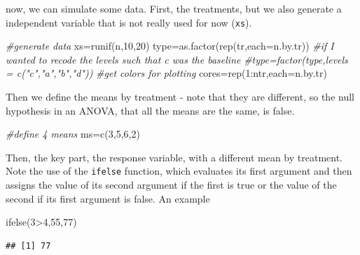 \documentclass[
]{book}
\newenvironment{Shaded}{\begin{snugshade}}{\end{snugshade}}
\newcommand{\AttributeTok}[1]{\textcolor[rgb]{0.77,0.63,0.00}{#1}}
\newcommand{\CommentTok}[1]{\textcolor[rgb]{0.56,0.35,0.01}{\textit{#1}}}
\newcommand{\DecValTok}[1]{\textcolor[rgb]{0.00,0.00,0.81}{#1}}
\newcommand{\FunctionTok}[1]{\textcolor[rgb]{0.00,0.00,0.00}{#1}}
\newcommand{\NormalTok}[1]{#1}
\newcommand{\OtherTok}[1]{\textcolor[rgb]{0.56,0.35,0.01}{#1}}
\newcommand{\SpecialCharTok}[1]{\textcolor[rgb]{0.00,0.00,0.00}{#1}}
\begin{document}
now, we can simulate some data. First, the treatments, but we also generate a independent variable that is not really used for now (\texttt{xs}).

\begin{Shaded}
\begin{Highlighting}[]
\CommentTok{\#generate data}
\NormalTok{xs}\OtherTok{=}\FunctionTok{runif}\NormalTok{(n,}\DecValTok{10}\NormalTok{,}\DecValTok{20}\NormalTok{)}
\NormalTok{type}\OtherTok{=}\FunctionTok{as.factor}\NormalTok{(}\FunctionTok{rep}\NormalTok{(tr,}\AttributeTok{each=}\NormalTok{n.by.tr))}
\CommentTok{\#if I wanted to recode the levels such that c was the baseline}
\CommentTok{\#type=factor(type,levels = c("c","a","b","d"))}
\CommentTok{\#get colors for plotting}
\NormalTok{cores}\OtherTok{=}\FunctionTok{rep}\NormalTok{(}\DecValTok{1}\SpecialCharTok{:}\NormalTok{ntr,}\AttributeTok{each=}\NormalTok{n.by.tr)}
\end{Highlighting}
\end{Shaded}

Then we define the means by treatment - note that they are different, so the null hypothesis in an ANOVA, that all the means are the same, is false.

\begin{Shaded}
\begin{Highlighting}[]
\CommentTok{\#define 4 means}
\NormalTok{ms}\OtherTok{=}\FunctionTok{c}\NormalTok{(}\DecValTok{3}\NormalTok{,}\DecValTok{5}\NormalTok{,}\DecValTok{6}\NormalTok{,}\DecValTok{2}\NormalTok{)}
\end{Highlighting}
\end{Shaded}

Then, the key part, the response variable, with a different mean by treatment. Note the use of the \texttt{ifelse} function, which evaluates its first argument and then assigns the value of its second argument if the first is true or the value of the second if its first argument is false. An example

\begin{Shaded}
\begin{Highlighting}[]
\FunctionTok{ifelse}\NormalTok{(}\DecValTok{3}\SpecialCharTok{\textgreater{}}\DecValTok{4}\NormalTok{,}\DecValTok{55}\NormalTok{,}\DecValTok{77}\NormalTok{)}
\end{Highlighting}
\end{Shaded}

\begin{verbatim}
## [1] 77
\end{verbatim}
\end{document}
